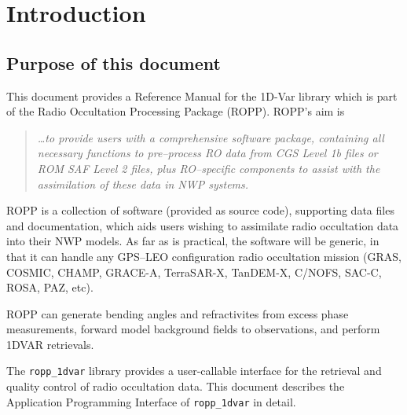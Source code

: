 
\chapter{Introduction}\label{chap:introduction}

\section{Purpose of this document}

This document provides a Reference Manual for the 1D-Var
library which is part of the Radio Occultation Processing Package
(ROPP). ROPP's aim is
%
\begin{quote}
  \emph{\ldots{}to provide users with a comprehensive software
    package, containing all necessary functions to pre--process RO
    data from CGS Level 1b files or ROM SAF Level 2 files, plus
    RO--specific components to assist with the assimilation of these
    data in NWP systems.}
\end{quote}
%
ROPP is a collection of software (provided as source code), supporting
data files and documentation, which aids users wishing to assimilate
radio occultation data into their NWP models. As far as is practical,
the software will be generic, in that it can handle any GPS--LEO
configuration radio occultation mission (GRAS, COSMIC, CHAMP, GRACE-A, 
TerraSAR-X, TanDEM-X, C/NOFS, SAC-C, ROSA, PAZ, etc). 

ROPP can generate bending angles and refractivites from excess phase 
measurements, forward model background fields to observations, 
and perform 1DVAR retrievals. 

The \texttt{ropp\_1dvar} library provides a user-callable interface
for the retrieval and quality control of radio occultation data.
This document describes the Application Programming Interface of 
\texttt{ropp\_1dvar} in detail.

